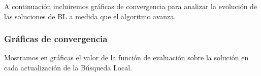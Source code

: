 \documentclass{article}
\begin{document}
   A continuación incluiremos gráficas de convergencia para analizar la evolución de las soluciones de BL a medida que el algoritmo
   avanza.
   
\pagebreak
   
\subsubsection{Gráficas de convergencia}

Mostramos en gráficas el valor de la función de evaluación sobre la solución en cada actualización de la Búsqueda Local.

\begin{figure}[H]
	\centering

\end{figure}
\end{document}
